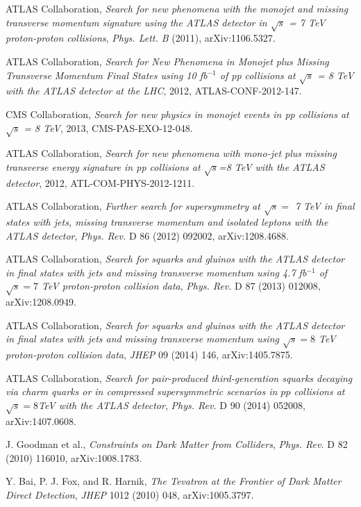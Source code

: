  ATLAS Collaboration, \emph{Search for new phenomena with the monojet and missing transverse momentum signature using the ATLAS detector in $\sqrt{s}$ = 7 TeV proton-proton collisions}, \emph{Phys. Lett. B} (2011), arXiv:1106.5327.

 ATLAS Collaboration, \emph{Search for New Phenomena in Monojet plus Missing Transverse Momentum Final States using 10 fb$^{-1}$ of pp collisions at $\sqrt{s}$ = 8 TeV with the ATLAS detector at the LHC}, 2012, ATLAS-CONF-2012-147.

 CMS Collaboration, \emph{Search for new physics in monojet events in pp collisions at $\sqrt{s}$ = 8 TeV}, 2013, CMS-PAS-EXO-12-048.

 ATLAS Collaboration, \emph{Search for new phenomena with mono-jet plus missing transverse energy signature in pp collisions at $\sqrt{s}$=8 TeV with the ATLAS detector}, 2012, ATL-COM-PHYS-2012-1211.

 ATLAS Collaboration, \emph{Further search for supersymmetry at $\sqrt{s} =$ 7 TeV in final states with jets, missing transverse momentum and isolated leptons with the ATLAS detector}, \emph{Phys. Rev.} D 86 (2012) 092002, arXiv:1208.4688.

 ATLAS Collaboration, \emph{Search for squarks and gluinos with the ATLAS detector in final states with jets and missing transverse momentum using 4.7 fb$^{-1}$ of $\sqrt{s}=7$ TeV proton-proton collision data}, \emph{Phys. Rev.} D 87 (2013) 012008, arXiv:1208.0949.

 ATLAS Collaboration, \emph{Search for squarks and gluinos with the ATLAS detector in final states with jets and missing transverse momentum using $\sqrt{s}=8$ TeV proton-proton collision data}, \emph{JHEP} 09 (2014) 146, arXiv:1405.7875.

 ATLAS Collaboration, \emph{Search for pair-produced third-generation squarks decaying via charm quarks or in compressed supersymmetric scenarios in $pp$ collisions at $\sqrt{s}=8 $TeV with the ATLAS detector}, \emph{Phys. Rev.} D 90 (2014) 052008, arXiv:1407.0608.

 J. Goodman et al., \emph{Constraints on Dark Matter from Colliders}, \emph{Phys. Rev.} D 82 (2010) 116010, arXiv:1008.1783.

 Y. Bai, P. J. Fox, and R. Harnik, \emph{The Tevatron at the Frontier of Dark Matter Direct Detection}, \emph{JHEP} 1012 (2010) 048, arXiv:1005.3797.

